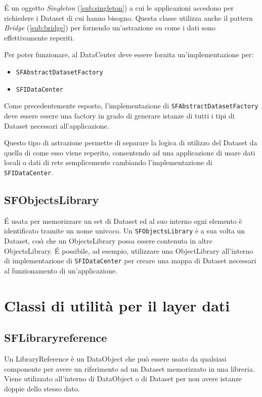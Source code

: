 \'E un oggetto \textit{Singleton} (\ref{sub:singleton}) a cui le applicazioni accedono per richiedere i Dataset di cui hanno bisogno. Questa classe utilizza anche il pattern \textit{Bridge} (\ref{sub:bridge}) per fornendo un'astrazione su come i dati sono effettivamente reperiti.

Per poter funzionare, al DataCenter deve essere fornita un'implementazione per:
\begin{itemize}
	\item \texttt{SFAbstractDatasetFactory}
	\item \texttt{SFIDataCenter}
\end{itemize}

Come precedentemente esposto, l'implementazione di \texttt{SFAbstractDatasetFactory} deve essere essere una factory in grado di generare istanze di tutti i tipi di Dataset necessari all'applicazione.

Questo tipo di astrazione permette di separare la logica di utilizzo del Dataset da quella di come esso viene reperito, consentendo ad una applicazione di usare dati locali o dati di rete semplicemente cambiando l'implementazione di \texttt{SFIDataCenter}.

\subsection{SFObjectsLibrary}
\label{sub:sfobjectslibrary}
\'E usata per memorizzare un set di Dataset ed al suo interno ogni elemento \`e identificato tramite un nome univoco.
Un \texttt{SFObjectsLibrary} \`e a sua volta un Dataset, cos{\`\i} che un ObjectsLibrary possa essere contenuta in altre ObjectsLibrary.
\'E possibile, ad esempio, utilizzare una ObjectLibrary all'interno di implementazione di \texttt{SFIDataCenter} per creare una mappa di Dataset necessari al funzionamento di un'applicazione.

\section{Classi di utilit\`a per il layer dati}

\subsection{SFLibraryreference}
\label{sub:sflibraryreference}
Un LibraryReference \`e un DataObject che pu\`o essere usato da qualsiasi componente per avere un riferimento ad un Dataset memorizzato in una libreria. Viene utilizzato all'interno di DataObject o di Dataset per non avere istanze doppie dello stesso dato.


